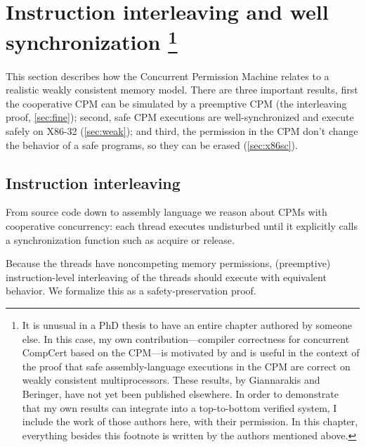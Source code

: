 \chapter[Instruction interleaving and well synchronization]{Instruction interleaving and well synchronization
\footnote{It is unusual in a PhD thesis to have an entire chapter authored by someone else.  In this case, my own contribution---compiler correctness for concurrent CompCert based on the CPM---is motivated by and is useful in the context of the proof that safe assembly-language executions in the CPM are correct on weakly consistent multiprocessors. These results, by Giannarakis and Beringer, have not yet been published elsewhere.  In order to demonstrate that my own results can integrate into a top-to-bottom verified system, I include the work of those authors here, with their permission. In this chapter, everything besides this footnote is written by the authors mentioned above. }
}
\label{sec:asm_proofs}





This section describes how the Concurrent Permission Machine relates to a realistic weakly consistent memory model. There are three important results, 
first the cooperative CPM can be simulated by a preemptive CPM (the interleaving proof, \autoref{sec:fine}); second, safe CPM executions are well-synchronized and execute safely on X86-32 (\autoref{sec:weak}); and third, the permission in the CPM don't change the behavior of a safe programs, so they can be erased (\autoref{sec:x86sc}).





\section{Instruction interleaving}
\label{sec:fine}
From source code down to assembly language we
reason about CPMs with cooperative concurrency: each thread
executes undisturbed until it explicitly calls a
synchronization function such as acquire or release.

Because the threads have noncompeting memory permissions,
(preemptive) instruction-level interleaving of the threads should
execute with equivalent behavior.  We formalize this as a
safety-preservation proof.

